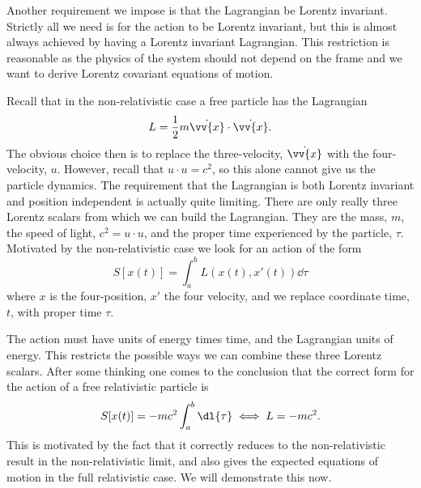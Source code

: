 \documentclass[fleqn]{NotesClass}
\newcommand*{\lagrangian}{L}
\begin{document}
    Another requirement we impose is that the Lagrangian be Lorentz invariant.
    Strictly all we need is for the action to be Lorentz invariant, but this is almost always achieved by having a Lorentz invariant Lagrangian.
    This restriction is reasonable as the physics of the system should not depend on the frame and we want to derive Lorentz covariant equations of motion.
    
    Recall that in the non-relativistic case a free particle has the Lagrangian
    \begin{equation}
        \lagrangian = \frac{1}{2}m\dot{\vv{x}}\cdot\dot{\vv{x}}.
    \end{equation}
    The obvious choice then is to replace the three-velocity, \(\dot{\vv{x}}\) with the four-velocity, \(u\).
    However, recall that \(u \cdot u = c^2\), so this alone cannot give us the particle dynamics.
    The requirement that the Lagrangian is both Lorentz invariant and position independent is actually quite limiting.
    There are only really three Lorentz scalars from which we can build the Lagrangian.
    They are the mass, \(m\), the speed of light, \(c^2 = u \cdot u\), and the proper time experienced by the particle, \(\tau\).
    Motivated by the non-relativistic case we look for an action of the form
    \begin{equation}
        S[x(t)] = \int_a^b \lagrangian(x(t), x'(t)) \dd{\tau}
    \end{equation}
    where \(x\) is the four-position, \(x'\) the four velocity, and we replace coordinate time, \(t\), with proper time \(\tau\).
    
    The action must have units of energy times time, and the Lagrangian units of energy.
    This restricts the possible ways we can combine these three Lorentz scalars.
    After some thinking one comes to the conclusion that the correct form for the action of a free relativistic particle is
    \begin{equation}
        S[x(t)] = -mc^2 \int_a^b \dl{\tau} \iff \lagrangian = -mc^2.
    \end{equation}
    This is motivated by the fact that it correctly reduces to the non-relativistic result in the non-relativistic limit, and also gives the expected equations of motion in the full relativistic case.
    We will demonstrate this now.
    
\end{document}
